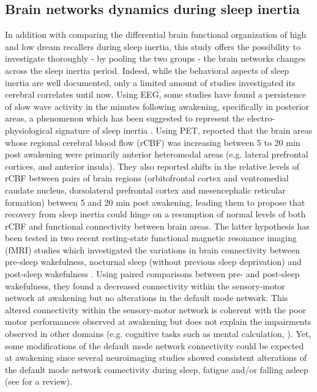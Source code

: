 \subsection{Brain networks dynamics during sleep inertia}
\label{sec:problematic:inertia:overview}

In addition with comparing the differential brain functional organization of high and low dream recallers during sleep inertia, this study offers the possibility to investigate thoroughly - by pooling the two groups - the brain networks changes across the sleep inertia period. Indeed, while the behavioral aspects of sleep inertia are well documented, only a limited amount of studies investigated its cerebral correlates until now. Using EEG, some studies have found a persistence of slow wave activity in the minutes following awakening, specifically in posterior areas, a phenomenon which has been suggested to represent the electro-physiological signature of sleep inertia \citep{ogilvie_falling_1992, ferrara_electroencephalographic_2006, marzano_recalling_2011, gorgoni_eeg_2015}. Using PET, \citet{balkin_process_2002} reported that the brain areas whose regional cerebral blood flow (rCBF) was increasing between 5 to 20 min post awakening were primarily anterior heteromodal areas (e.g. lateral prefrontal cortices, and anterior insula). They also reported shifts in the relative levels of rCBF between pairs of brain regions (orbitofrontal cortex and ventromedial caudate nucleus, dorsolateral prefrontal cortex and mesencephalic reticular formation) between 5 and 20 min post awakening, leading them to propose that recovery from sleep inertia could hinge on a resumption of normal levels of both rCBF and functional connectivity between brain areas. The latter hypothesis has been tested in two recent resting-state functional magnetic resonance imaging (fMRI) studies which investigated the variations in brain connectivity between pre-sleep wakefulness, nocturnal sleep (without previous sleep deprivation) and post-sleep
wakefulness \citep{wu_variations_2012, tsai_local_2014}. Using paired comparisons between pre- and post-sleep wakefulness, they found a decreased connectivity within the sensory-motor network at awakening but no alterations in the default mode network. This altered connectivity within the sensory-motor network is coherent with the poor motor performances observed at awakening but does not explain the impairments observed in other domains (e.g. cognitive tasks such as mental calculation, \citealp{tassi_sleep_2000, trotti_waking_2016}). Yet, some modifications of the default mode network connectivity could be expected at awakening since several neuroimaging studies showed consistent alterations of the default mode network connectivity during sleep, fatigue and/or falling asleep (see \citealp{picchioni_sleep_2013} for a review).

